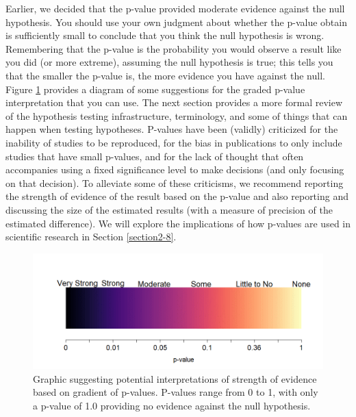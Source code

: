\documentclass[
]{book}
\begin{document}
\indent Earlier, we decided that the p-value provided moderate evidence against
the null hypothesis. You should use your own judgment about whether the p-value obtain is sufficiently small to conclude that you think the null hypothesis is wrong. Remembering
that the p-value is the probability
you would observe a result like you did (or more extreme), assuming the null
hypothesis is true; this tells you that the smaller the p-value is, the more
evidence you have against the null. Figure \ref{fig:Figure2-11} provides a
diagram of some suggestions for the graded p-value interpretation that you can
use. The next section provides a more formal
review of the hypothesis testing
infrastructure, terminology, and some of
things that can happen when testing hypotheses. P-values have been (validly)
criticized for the inability of studies to be reproduced, for the bias in
publications to only include studies that have small p-values, and for the lack of
thought that often accompanies using a fixed significance level to make decisions (and only focusing on that decision). To alleviate
some of these criticisms, we recommend reporting the strength of evidence of the
result based on the p-value and also reporting and discussing the size of the
estimated results (with a measure of precision of the estimated difference). We will explore the implications of how p-values are used in scientific research in Section \ref{section2-8}.



\begin{figure}[ht!]

{\centering \includegraphics[width=1\linewidth]{chapter2_files/pvalueStrengths} 

}

\caption{Graphic suggesting potential interpretations of strength of evidence based on gradient of p-values. P-values range from 0 to 1, with only a p-value of 1.0 providing no evidence against the null hypothesis.}\label{fig:Figure2-11}
\end{figure}
\end{document}
